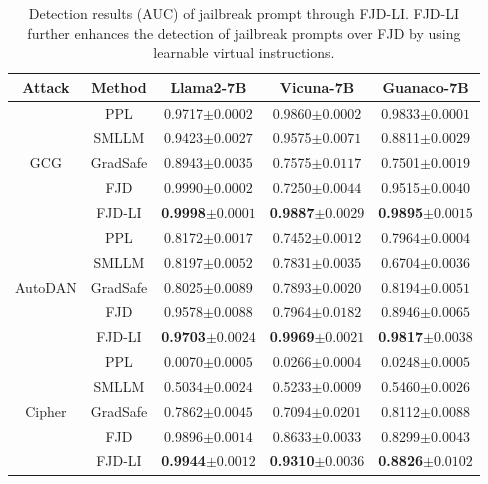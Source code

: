 \documentclass{article}
\begin{document}
\begin{table}[t]
  \caption{Detection results (AUC) of jailbreak prompt through FJD-LI. FJD-LI further enhances the detection of jailbreak prompts over FJD by using learnable virtual instructions.}

  \label{learnable-prom-2}
  \centering
  \setlength\tabcolsep{22pt}
  \footnotesize
  \begin{tabular}{ccccc}
    \toprule
    \textbf{Attack}  & \textbf{Method}  & \textbf{Llama2-7B}  & \textbf{Vicuna-7B}& \textbf{Guanaco-7B}\\
    \midrule

    \multirow{5}{*}{GCG}
    & PPL  & 0.9717\tiny{$\pm 0.0002$} & 0.9860\tiny{$\pm 0.0002$} &0.9833\tiny{$\pm 0.0001$}\\
    & SMLLM & 0.9423\tiny{$\pm 0.0027$} & 0.9575\tiny{$\pm 0.0071$} &0.8811\tiny{$\pm 0.0029$}\\
    & GradSafe & 0.8943\tiny{$\pm 0.0035$} & 0.7575\tiny{$\pm 0.0117$} & 0.7501\tiny{$\pm 0.0019$} \\
    & FJD & 0.9990\tiny{$\pm 0.0002$} & 0.7250\tiny{$\pm 0.0044$} &0.9515\tiny{$\pm 0.0040$}\\
    & FJD-LI & \textbf{0.9998}\tiny{$\pm 0.0001$} &  \textbf{0.9887}\tiny{$\pm 0.0029$}&\textbf{0.9895}\tiny{$\pm 0.0015$}\\
    \midrule
     
    \multirow{5}{*}{AutoDAN}
    & PPL  & 0.8172\tiny{$\pm 0.0017$} & 0.7452\tiny{$\pm 0.0012$} &0.7964\tiny{$\pm 0.0004$}\\
    & SMLLM & 0.8197\tiny{$\pm 0.0052$} & 0.7831\tiny{$\pm 0.0035$} &0.6704\tiny{$\pm 0.0036$}\\
    & GradSafe & 0.8025\tiny{$\pm 0.0089$} & 0.7893\tiny{$\pm 0.0020$} & 0.8194\tiny{$\pm 0.0051$} \\
    & FJD & 0.9578\tiny{$\pm 0.0088$} & 0.7964\tiny{$\pm 0.0182$} &0.8946\tiny{$\pm 0.0065$}\\
    & FJD-LI & \textbf{0.9703}\tiny{$\pm 0.0024$} &  \textbf{0.9969}\tiny{$\pm 0.0021$}&\textbf{0.9817}\tiny{$\pm 0.0038$}\\
    \midrule
    \multirow{5}{*}{Cipher}   
    & PPL & 0.0070\tiny{$\pm 0.0005$} & 0.0266\tiny{$\pm 0.0004$} &0.0248\tiny{$\pm 0.0005$}\\
    & SMLLM & 0.5034\tiny{$\pm 0.0024$} & 0.5233\tiny{$\pm 0.0009$} &0.5460\tiny{$\pm 0.0026$} \\
    & GradSafe & 0.7862\tiny{$\pm 0.0045$} & 0.7094\tiny{$\pm 0.0201$} & 0.8112\tiny{$\pm 0.0088$} \\
    & FJD & 0.9896\tiny{$\pm 0.0014$} & 0.8633\tiny{$\pm 0.0033$} &0.8299\tiny{$\pm 0.0043$}\\
    & FJD-LI & \textbf{0.9944}\tiny{$\pm 0.0012$} & \textbf{0.9310}\tiny{$\pm 0.0036$} &\textbf{0.8826}\tiny{$\pm 0.0102$}\\
    

\end{tabular}
\end{table}
\end{document}
